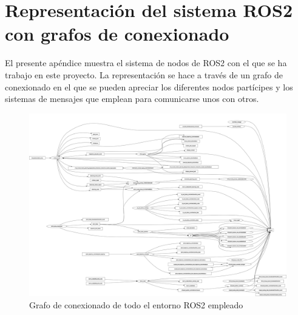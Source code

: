 \chapter{Representación del sistema ROS2 con grafos de conexionado} \label{cap: anexo grafos nodos ros2}

El presente apéndice muestra el sistema de nodos de ROS2 con el que se ha trabajo en este proyecto. La representación se hace a través de un grafo de conexionado en el que se pueden apreciar los diferentes nodos partícipes y los sistemas de mensajes que emplean para comunicarse unos con otros.

\begin{landscape}
    \begin{figure}[h!]
    \centering
    \includegraphics[scale=0.13, angle=0.0]{figuras/rosgraph super_logger.png}
    \caption{Grafo de conexionado de todo el entorno ROS2 empleado}
    \label{fig: grafo conexionado ros2}
\end{figure}
\end{landscape}

